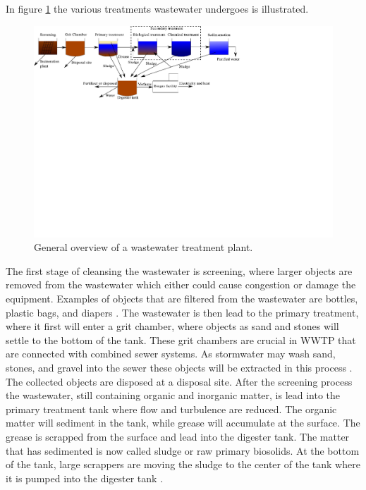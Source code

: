 In figure \ref{fig:wwtp_process} the various treatments wastewater undergoes is illustrated. 
\begin{figure}[H]
\centering
\includegraphics[clip, trim=0cm 13cm 9cm 0cm, width=1.00\textwidth]{report/introduction/pictures/WWTP_overview}
\caption{General overview of a wastewater treatment plant.}
\label{fig:wwtp_process}
\end{figure}

The first stage of cleansing the wastewater is screening, where larger objects are removed from the wastewater which either could cause congestion or damage the equipment. Examples of objects that are filtered from the wastewater are bottles, plastic bags, and diapers \cite{wwtp_process}. %
The wastewater is then lead to the primary treatment, where it first will enter a grit chamber, where objects as sand and stones will settle to the bottom of the tank. These grit chambers are crucial in WWTP that are connected with combined sewer systems. %
As stormwater may wash sand, stones, and gravel into the sewer these objects will be extracted in this process \cite{epa_wwtp}. The collected objects are disposed at a disposal site. 
After the screening process the wastewater, still containing organic and inorganic matter, is lead into the primary treatment tank where flow and turbulence are reduced.
The organic matter will sediment in the tank, while grease will accumulate at the surface. 
The grease is scrapped from the surface and lead into the digester tank. The matter that has sedimented is now called sludge or raw primary biosolids. At the bottom of the tank, large scrappers are moving the sludge to the center of the tank where it is pumped into the digester tank \cite{epa_wwtp}.%

